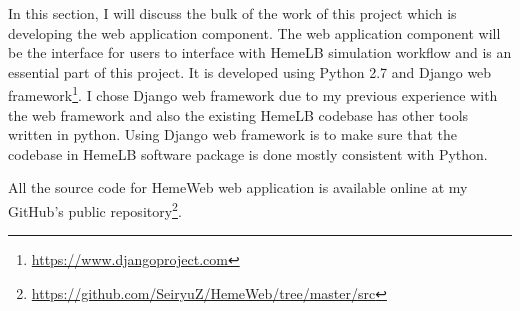 In this section, I will discuss the bulk of the work of this project which is developing the web application component. The web application component will be the interface for users to interface with HemeLB simulation workflow and is an essential part of this project. It is developed using Python 2.7 and Django web framework\footnote{\url{https://www.djangoproject.com}}. I chose Django web framework due to my previous experience with the web framework and also the existing HemeLB codebase has other tools written in python. Using Django web framework is to make sure that the codebase in HemeLB software package is done mostly consistent with Python. 

All the source code for HemeWeb web application is available online at my GitHub's public repository\footnote{\url{https://github.com/SeiryuZ/HemeWeb/tree/master/src}}.



